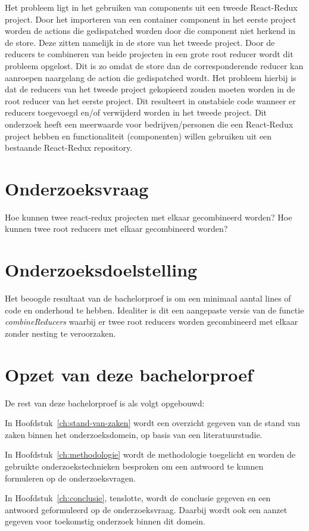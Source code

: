 Het probleem ligt in het gebruiken van components uit een tweede React-Redux project. Door het importeren van een container component in het eerste project worden de actions die gedispatched worden door die component niet herkend in de store. Deze zitten namelijk in de store van het tweede project. Door de reducers te combineren van beide projecten in een grote root reducer wordt dit probleem opgelost. Dit is zo omdat de store dan de corresponderende reducer kan aanroepen naargelang de action die gedispatched wordt. Het probleem hierbij is dat de reducers van het tweede project gekopieerd zouden moeten worden in de root reducer van het eerste project. Dit resulteert in onstabiele code wanneer er reducers toegevoegd en/of verwijderd worden in het tweede project. Dit onderzoek heeft een meerwaarde voor bedrijven/personen die een React-Redux project hebben en functionaliteit (componenten) willen gebruiken uit een bestaande React-Redux repository. 


\section{Onderzoeksvraag}
\label{sec:onderzoeksvraag}
Hoe kunnen twee react-redux projecten met elkaar gecombineerd worden?
Hoe kunnen twee root reducers met elkaar gecombineerd worden?

\section{Onderzoeksdoelstelling}
\label{sec:onderzoeksdoelstelling}
Het beoogde resultaat van de bachelorproef is om een minimaal aantal lines of code en onderhoud te hebben. Idealiter is dit een aangepaste versie van de functie \textit{combineReducers} waarbij er twee root reducers worden gecombineerd met elkaar zonder nesting te veroorzaken.

\section{Opzet van deze bachelorproef}
\label{sec:opzet-bachelorproef}


De rest van deze bachelorproef is als volgt opgebouwd:

In Hoofdstuk~\ref{ch:stand-van-zaken} wordt een overzicht gegeven van de stand van zaken binnen het onderzoeksdomein, op basis van een literatuurstudie.

In Hoofdstuk~\ref{ch:methodologie} wordt de methodologie toegelicht en worden de gebruikte onderzoekstechnieken besproken om een antwoord te kunnen formuleren op de onderzoeksvragen.


In Hoofdstuk~\ref{ch:conclusie}, tenslotte, wordt de conclusie gegeven en een antwoord geformuleerd op de onderzoeksvraag. Daarbij wordt ook een aanzet gegeven voor toekomstig onderzoek binnen dit domein.

